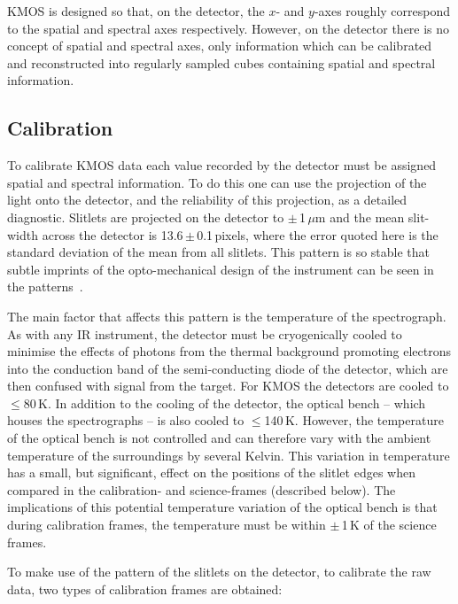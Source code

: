 KMOS is designed so that, on the detector, the $x$- and $y$-axes roughly correspond to the spatial and spectral axes respectively.
However, on the detector there is no concept of spatial and spectral axes,
only information which can be calibrated and reconstructed into regularly sampled cubes containing spatial and spectral information.


\subsection{Calibration} %
\label{sub:calibration}

To calibrate KMOS data each value recorded by the detector must be assigned spatial and spectral information.
To do this one can use the projection of the light onto the detector, and the reliability of this projection, as a detailed diagnostic.
Slitlets are projected on the detector to $\pm$\,1\,$\mu$m
\citep[roughly 1/18$^{\rm th}$ of a pixel;][]{2013A&A...558A..56D} and
the mean slit-width across the detector is 13.6\,$\pm$\,0.1\,pixels,
where the error quoted here is the standard deviation of the mean from all slitlets.
This pattern is so stable that subtle imprints of the opto-mechanical design of the instrument can be seen in the patterns~\citep[see Fig. 2 of ][]{2013A&A...558A..56D}.

The main factor that affects this pattern is the temperature of the spectrograph.
As with any IR instrument, the detector must be cryogenically cooled to minimise the effects of photons from the thermal background promoting electrons into the conduction band of the semi-conducting diode of the detector, which are then confused with signal from the target.
For KMOS the detectors are cooled to $\le$80\,K.
In addition to the cooling of the detector, the optical bench -- which houses the spectrographs -- is also cooled to $\le$140\,K.
However, the temperature of the optical bench is not controlled and can therefore vary with the ambient temperature of the surroundings by several Kelvin.
This variation in temperature has a small, but significant, effect on the positions of the slitlet edges when compared in the calibration- and science-frames (described below).
The implications of this potential temperature variation of the optical bench is that during calibration frames, the temperature must be within $\pm$\,1\,K of the science frames.

To make use of the pattern of the slitlets on the detector, to calibrate the raw data, two types of calibration frames are obtained:

